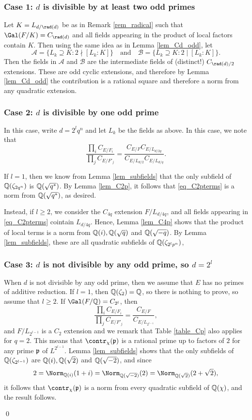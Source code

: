 \subsubsection*{Case 1: $d$ is divisible by at least two odd primes}
Let $K=L_{d/\rad(d)}$ be as in Remark \ref{rem_radical} such that $\Gal(F/K)=C_{\rad(d)}$ and all fields appearing in the product of local factors contain $K$. Then using the same idea as in Lemma \ref{lem_Cd_odd}, let 
$$\mathcal{A}=\{L_k\supseteq K:2\nmid [L_k:K]\}\quad\text{and}\quad\mathcal{B}=\{L_k\supseteq K:2\mid [L_k:K]\}.$$
Then the fields in $\mathcal{A}$ and $\mathcal{B}$ are the intermediate fields of (distinct!) $C_{\rad(d)/2}$ extensions. These are odd cyclic extensions, and therefore by Lemma \ref{lem_Cd_odd} the contribution is a rational square and therefore a norm from any quadratic extension.

\subsubsection*{Case 2: $d$ is divisible by one odd prime}
In this case, write $d=2^lq^n$ and let $L_k$ be the fields as above. In this case, we note that
\begin{equation}\label{eq_C2pterms}
    \frac{\prod_i C_{E/F_i}}{\prod_j C_{E/F'_j}}=\frac{C_{E/F}C_{E/L_{d/2q}}}{C_{E/L_{d/2}}C_{E/L_{d/q}}}.
\end{equation} 

If $l=1$, then we know from Lemma \ref{lem_subfields} that the only subfield of $\mathbb{Q}(\zeta_{2q^n})$ is $\mathbb{Q}(\sqrt{q^*})$. By Lemma \ref{lem_C2p}, it follows that \eqref{eq_C2pterms} is a norm from $\mathbb{Q}(\sqrt{q^*})$, as desired.

Instead, if $l\geq2$, we consider the $C_{4q}$ extension $F/L_{d/4q}$, and all fields appearing in \eqref{eq_C2pterms} cointain $L_{d/4q}$. Hence, Lemma \ref{lem_C4p} shows that the product of local terms is a norm from $\mathbb{Q}(i), \mathbb{Q}(\sqrt{q})$ and $\mathbb{Q}(\sqrt{-q})$. By Lemma \ref{lem_subfields}, these are all quadratic subfields of $\mathbb{Q}(\zeta_{2^lp^n})$, 

\subsubsection*{Case 3: $d$ is not divisible by any odd prime, so $d=2^l$}

When $d$ is not divisible by any odd prime, then we assume that $E$ has no primes of additive reduction. If $l=1$, then $\mathbb{Q}(\zeta_2)=\mathbb{Q}$, so there is nothing to prove, so assume that $l\geq2$. If $\Gal(F/\QQ)=C_{2^l}$, then 
$$\frac{\prod_i C_{E/F_i}}{\prod_j C_{E/F'_j}}=\frac{C_{E/F}}{C_{E/L_{2^{l-1}}}},$$
and $F/L_{2^{l-1}}$ is a $C_2$ extension and we remark that Table \ref{table_Cp} also applies for $q=2$. This means that $\contr_\chi(\pp)$ is a rational prime up to factors of $2$ for any prime $\mathfrak{p}$ of $L^{2^{l-1}}$. Lemma \ref{lem_subfields} shows that the only subfields of $\mathbb{Q}(\zeta_{2^{l-1}})$ are $\mathbb{Q}(i),\mathbb{Q}(\sqrt{2})$ and $\mathbb{Q}(\sqrt{-2})$, and since 
$$2=\Norm_{\QQ(i)}(1+i)=\Norm_{\QQ(\sqrt{-2})}(2)=\Norm_{\QQ(\sqrt{2})}(2+\sqrt{2}),$$
it follows that $\contr_\chi(\pp)$ is a norm from every quadratic subfield of $\mathbb{Q}(\chi)$, and the result follows.

\qed
